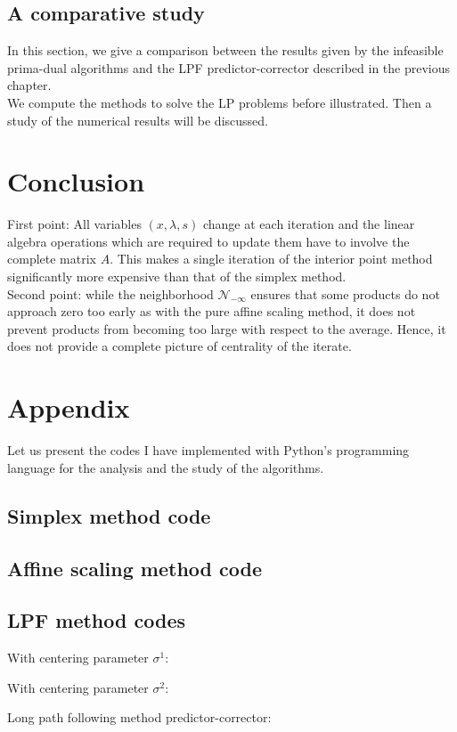 \documentclass[a4paper,10 pt,titlepage,twoside]{book}
\theoremstyle{plain}
\theoremstyle{definition}
\theoremstyle{remark}
\begin{document}
\section{A comparative study}
In this section, we give a comparison between the results given by the infeasible prima-dual algorithms and the LPF predictor-corrector described in the previous chapter.\\ We compute the methods to solve the LP problems before illustrated. Then a study of the numerical results will be discussed.


\chapter{Conclusion}
 First point: All variables $(x, \lambda, s)$ change at each iteration and the linear algebra operations which are required to update them have to involve the complete matrix $A$. This makes a single iteration of the interior point method significantly more expensive than that of the simplex method.\\
 Second point: while the neighborhood $\mathcal{N}_{-\infty}$ ensures that some products do not approach zero too early as with the pure affine scaling method, it does not prevent products from becoming too large with respect to the average. Hence, it does not provide a complete picture of centrality of the iterate.

\appendix
\chapter*{Appendix}	
 Let us present the codes I have implemented with Python's programming language for the analysis and the study of the algorithms.
 \section*{Simplex method code}\label{app:A.1}
 
 \section*{Affine scaling method code}
 
 \section*{LPF method codes}
 With centering parameter $\sigma^{1}$:
 
With centering parameter $\sigma^{2}$:
 
Long path following method predictor-corrector:
 
\end{document}
